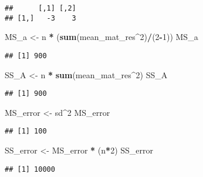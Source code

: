 \documentclass[]{article}
\newenvironment{Shaded}{\begin{snugshade}}{\end{snugshade}}
\newcommand{\KeywordTok}[1]{\textcolor[rgb]{0.13,0.29,0.53}{\textbf{#1}}}
\newcommand{\DecValTok}[1]{\textcolor[rgb]{0.00,0.00,0.81}{#1}}
\newcommand{\StringTok}[1]{\textcolor[rgb]{0.31,0.60,0.02}{#1}}
\newcommand{\OperatorTok}[1]{\textcolor[rgb]{0.81,0.36,0.00}{\textbf{#1}}}
\newcommand{\NormalTok}[1]{#1}
\begin{document}
\begin{verbatim}
##      [,1] [,2]
## [1,]   -3    3
\end{verbatim}

\begin{Shaded}
\begin{Highlighting}[]
\NormalTok{MS_a <-}\StringTok{ }\NormalTok{n }\OperatorTok{*}\StringTok{ }\NormalTok{(}\KeywordTok{sum}\NormalTok{(mean_mat_res}\OperatorTok{^}\DecValTok{2}\NormalTok{)}\OperatorTok{/}\NormalTok{(}\DecValTok{2}\OperatorTok{-}\DecValTok{1}\NormalTok{))}
\NormalTok{MS_a}
\end{Highlighting}
\end{Shaded}

\begin{verbatim}
## [1] 900
\end{verbatim}

\begin{Shaded}
\begin{Highlighting}[]
\NormalTok{SS_A <-}\StringTok{ }\NormalTok{n }\OperatorTok{*}\StringTok{ }\KeywordTok{sum}\NormalTok{(mean_mat_res}\OperatorTok{^}\DecValTok{2}\NormalTok{)}
\NormalTok{SS_A}
\end{Highlighting}
\end{Shaded}

\begin{verbatim}
## [1] 900
\end{verbatim}

\begin{Shaded}
\begin{Highlighting}[]
\NormalTok{MS_error <-}\StringTok{ }\NormalTok{sd}\OperatorTok{^}\DecValTok{2}
\NormalTok{MS_error}
\end{Highlighting}
\end{Shaded}

\begin{verbatim}
## [1] 100
\end{verbatim}

\begin{Shaded}
\begin{Highlighting}[]
\NormalTok{SS_error <-}\StringTok{ }\NormalTok{MS_error }\OperatorTok{*}\StringTok{ }\NormalTok{(n}\OperatorTok{*}\DecValTok{2}\NormalTok{) }
\NormalTok{SS_error}
\end{Highlighting}
\end{Shaded}

\begin{verbatim}
## [1] 10000
\end{verbatim}
\end{document}

